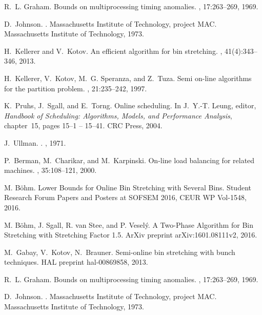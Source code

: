 \begin{thebibliography}{99}
R.~L. Graham.
\newblock Bounds on multiprocessing timing anomalies.
, 17:263--269, 1969.

D.~Johnson.
.
\newblock Massachusetts Institute of Technology, project MAC. Massachusetts
  Institute of Technology, 1973.

H.~Kellerer and V.~Kotov.
\newblock An efficient algorithm for bin stretching.
, 41(4):343--346, 2013.

H.~Kellerer, V.~Kotov, M.~G. Speranza, and Z.~Tuza.
\newblock Semi on-line algorithms for the partition problem.
, 21:235--242, 1997.

K.~Pruhs, J.~Sgall, and E.~Torng.
\newblock Online scheduling.
\newblock In J.~Y.-T. Leung, editor, {\em Handbook of Scheduling:
  {Algorithms}, Models, and Performance Analysis}, chapter~15, pages 15--1 --
  15--41. CRC Press, 2004.

J.~Ullman.
.
, 1971.

P.~Berman, M.~Charikar, and M.~Karpinski.
\newblock On-line load balancing for related machines.
, 35:108--121, 2000.

M. Böhm.
\newblock Lower Bounds for Online Bin Stretching with Several Bins.
\newblock Student Research Forum Papers and Posters at SOFSEM 2016, CEUR WP Vol-1548,
2016.

M. Böhm, J. Sgall, R. van Stee, and P. Veselý. 
\newblock A Two-Phase Algorithm for Bin Stretching with Stretching Factor 1.5.
\newblock ArXiv preprint arXiv:1601.08111v2,
2016.

M.~Gabay, V.~Kotov, N.~Brauner.
\newblock Semi-online bin stretching with bunch techniques.
\newblock HAL preprint hal-00869858,
2013.

R.~L. Graham.
\newblock Bounds on multiprocessing timing anomalies.
, 17:263--269, 1969.

D.~Johnson.
.
\newblock Massachusetts Institute of Technology, project MAC. Massachusetts
  Institute of Technology, 1973.


\end{thebibliography}
